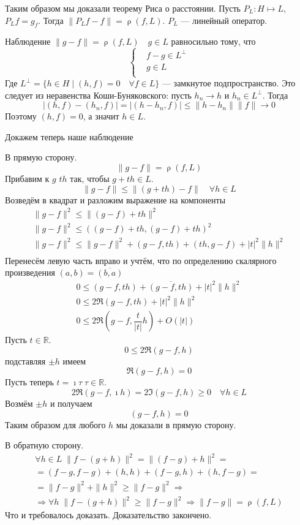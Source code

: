 \documentclass[14pt]{extarticle}
\DeclareMathOperator{\rh}{\rho}
\begin{document}
Таким образом мы доказали теорему Риса о расстоянии.
Пусть $P_L : H \mapsto L$, $P_L f = g_f$.
Тогда $\|P_Lf - f\| = \rh(f, L)$. $P_L$ --- линейный оператор.
\begin{MathCl}{Наблюдение}
	$\|g - f\| = \rh(f, L)\quad g \in L$ равносильно тому, что 
	$$
	\left\{
		\begin{aligned}
			&f - g \in L^\perp\\
        	&g \in L\\
    	\end{aligned}
	\right.
	$$
	Где $L^\perp = \{h \in H \mid (h, f) = 0 \quad \forall f \in L\}$ --- замкнутое подпространство.
	Это следует из неравенства Коши-Буняковского: пусть $h_n \to h$ и $h_n \in L^\perp$.
	Тогда
	$$
	|(h, f) - (h_n, f)| = |(h - h_n, f)| \le \|h - h_n\| \|f\|\to 0
	$$
	Поэтому $(h, f)=0$, а значит $h \in L$.
\end{MathCl}
Докажем теперь наше наблюдение
\begin{Proof}
    В прямую сторону.
    $$
    \|g - f\| = \rh(f, L)
    $$
    Прибавим к $g$ $th$ так, чтобы $g + th \in L$.
    $$
    \|g - f\| \le \|(g + t h) - f\| \quad \forall h \in L
    $$
    Возведём в квадрат и разложим выражение на компоненты
    \begin{gather*}
        \|g - f\|^2 \le \|(g - f) + t h\|^2\\
        \|g - f\|^2 \le ((g - f) + t h, (g - f) + t h)^2\\
        \|g - f\|^2 \le \|g - f\|^2 + (g - f, t h) + (t h, g - f) + |t|^2 \|h\|^2\\
	\end{gather*}
	Перенесём левую часть вправо и учтём, что по определению скалярного произведения $(a, b) = \overline{(b, a)}$
	\begin{gather*}
        0 \le (g - f, t h) + \overline{(g - f, t h)} + |t|^2 \|h\|^2\\ 
        0 \le 2\Re(g - f,t h) + |t|^2 \|h\|^2\\
        0 \le 2\Re(g - f, \dfrac{t}{|t|} h) + O(|t|)
	\end{gather*}
    Пусть $t \in \mathbb R$.
    $$
    0 \le 2\Re(g - f, h)
    $$
    подставляя $\pm h$ имеем
    $$
    \Re(g - f, h) = 0
    $$
    Пусть теперь $t = \imath \tau\; \tau \in \mathbb R$.
    $$
    2\Re(g - f, \imath h) = 2\Im(g - f, h) \ge 0\quad\forall h \in L
    $$
    Возмём $\pm h$ и получаем
    $$
    (g - f, h) = 0
    $$
    Таким образом для любого $h$ мы доказали в прямую сторону.
    
    В обратную сторону.
    \begin{multline*}
    \forall h \in L\;\|f - (g + h)\|^2 = \|(f - g) + h\|^2 =\\
     = (f - g, f - g) + (h, h) + (f - g, h) + (h, f - g) =\\
    = \|f - g\|^2+\|h\|^2 \ge \|f - g\|^2 \Rightarrow \\
    \Rightarrow \forall h\;\|f - (g + h)\|^2 \ge \|f - g\|^2 \Rightarrow \|f - g\| = \rh(f, L)
    \end{multline*}
    Что и требовалось доказать.
    Доказательство закончено.
\end{Proof}
\end{document}
